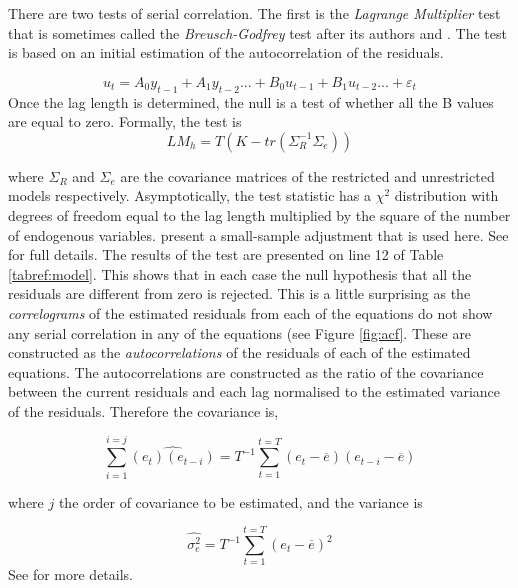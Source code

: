 \documentclass[12pt, a4paper, oneside]{article}\usepackage[]{graphicx}\usepackage[]{color}
\begin{document}
There are two tests of serial correlation.  The first is the \emph{Lagrange Multiplier} test that is sometimes called the \emph{Breusch-Godfrey} test after its authors \citep{Breusch1979} and \citep{Godfrey1978}. The test is based on an initial estimation of the autocorrelation of the residuals. 

\begin{equation}
u_t = A_0 y_{t-1} + A_1 y_{t-2}...+ B_0 u_{t-1} + B_1 u_{t-2}...+ \varepsilon_t
\end{equation}
Once the lag length is determined, the null is a test of whether all the B values are equal to zero.  Formally, the test is
\begin{equation}
LM_h = T(K - tr(\Sigma_R^{-1} \Sigma_e))
\end{equation}  

where  $\Sigma_R$ and $\Sigma_e$ are the covariance matrices of the restricted and unrestricted models respectively.  Asymptotically, the test statistic has a $\chi^2$ distribution with degrees of freedom equal to the lag length multiplied by the square of the number of endogenous variables.  \citep{EG} present a small-sample adjustment that is used here. See \citep[p. 29]{varsb} for full details.  The results of the test are presented on line 12 of Table \ref{tabref:model}.  This shows that in each case the null hypothesis that all the residuals are different from zero is rejected.  This is a little surprising as the \emph{correlograms} of the estimated residuals from each of the equations do not show any serial correlation in any of the equations (see Figure \ref{fig:acf}.  These are constructed as the \emph{autocorrelations} of the residuals of each of the estimated equations.  The autocorrelations are constructed as the ratio of the covariance between the current residuals and each lag normalised to the estimated variance of the residuals.  Therefore the covariance is,

\begin{equation}
\sum_{i=1}^{i=j}\hat{(e_t)(e_{t-i})} = T^{-1}\sum_{t=1}^{t=T}(e_t -\overline{e})(e_{t-i} - \overline{e})
\end{equation}    

where $j$ the order of covariance to be estimated, and the variance is 

\begin{equation}
\hat{\sigma_e^2} = T^{-1}\sum_{t=1}^{t=T}(e_t -\overline{e})^2
\end{equation}
See \citep[pp. 13 - 14]{HarveyTSM} for more details.  
\end{document}
